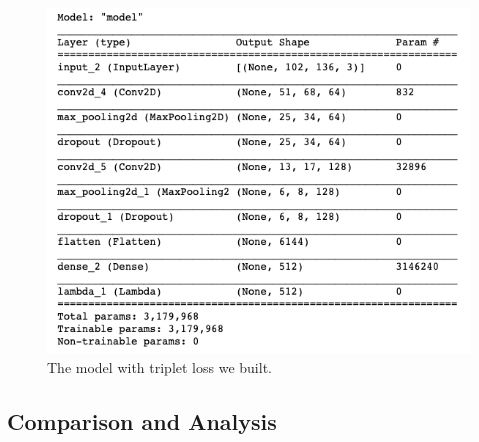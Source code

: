 
\begin{figure}[h]
  \centering
  \includegraphics[width=\linewidth]{figs/tri_model.png}
  \caption{The model with triplet loss we built.}
  \label{fig:tri_model}
\end{figure}




\subsection{Comparison and Analysis}

